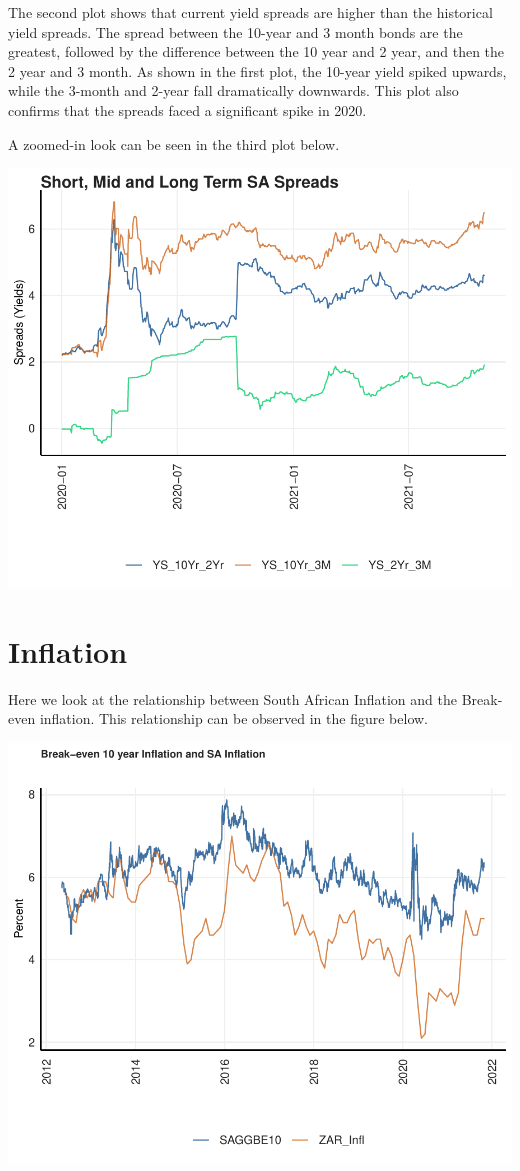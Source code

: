 \documentclass[11pt,preprint, authoryear]{elsarticle}
\numberwithin{equation}{section}
\numberwithin{figure}{section}
\numberwithin{table}{section}
\begin{document}
The second plot shows that current yield spreads are higher than the
historical yield spreads. The spread between the 10-year and 3 month
bonds are the greatest, followed by the difference between the 10 year
and 2 year, and then the 2 year and 3 month. As shown in the first plot,
the 10-year yield spiked upwards, while the 3-month and 2-year fall
dramatically downwards. This plot also confirms that the spreads faced a
significant spike in 2020.

A zoomed-in look can be seen in the third plot below.

\includegraphics{Question2_files/figure-latex/unnamed-chunk-7-1.pdf}

\hypertarget{inflation}{%
\section{Inflation}\label{inflation}}

Here we look at the relationship between South African Inflation and the
Break-even inflation. This relationship can be observed in the figure
below.

\includegraphics{Question2_files/figure-latex/unnamed-chunk-9-1.pdf}
\end{document}
